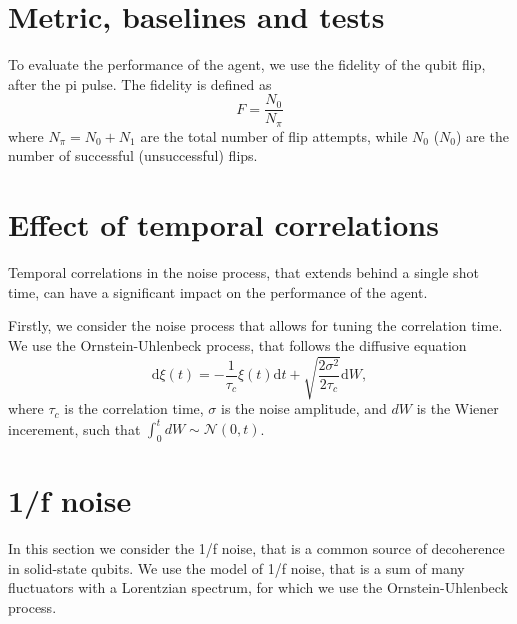 \documentclass[aps,twocolumn,pra,notitlepage,]{revtex4-2}
\begin{document}
\section{Metric, baselines and tests}

To evaluate the performance of the agent, we use the fidelity of the qubit flip, after the pi pulse. The fidelity is defined as
\begin{equation}
F = \frac{N_0}{N_\pi} 
\end{equation}
where $N_\pi =N_0 +N_1$ are the total number of flip attempts, while $N_0$ ($N_0$) are the number of successful (unsuccessful) flips. 

\section{Effect of temporal correlations}
Temporal correlations in the noise process, that extends behind a single shot time, can have a significant impact on the performance of the agent. 


Firstly, we consider the noise process that allows for tuning the correlation time. We use the Ornstein-Uhlenbeck process, that follows the diffusive equation
\begin{equation}
\text{d}\xi(t) = -\frac{1}{\tau_c} \xi(t) \text{d}t + \sqrt{\frac{2\sigma^2}{2\tau_c}}\text{d}W,
\end{equation}
where $\tau_c$ is the correlation time, $\sigma$ is the noise amplitude, and $dW$ is the Wiener incerement, such that $\int_0^t dW \sim \mathcal N(0,t)$. 



\section{1/f noise}
In this section we consider the 1/f noise, that is a common source of decoherence in solid-state qubits. We use the model of 1/f noise, that is a sum of many fluctuators with a Lorentzian spectrum, for which we use the Ornstein-Uhlenbeck process.
\end{document}

